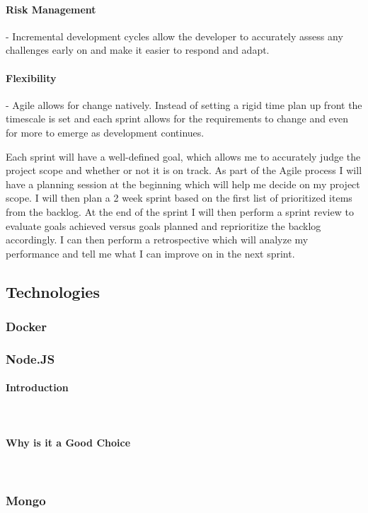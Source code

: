 \documentclass{article}
\begin{document}
\paragraph{Risk Management}- Incremental development cycles allow the developer to accurately assess any challenges early on and make it easier to respond and adapt.

\paragraph{Flexibility}- Agile allows for change natively. Instead of setting a rigid time plan up front the timescale is set and each sprint allows for the requirements to change and even for more to emerge as development continues.

Each sprint will have a well-defined goal, which allows me to accurately judge the project scope and whether or not it is on track. As part of the Agile process I will have a planning session at the beginning which will help me decide on my project scope. I will then plan a 2 week sprint based on the first list of prioritized items from the backlog.  At the end of the sprint I will then perform a sprint review to evaluate goals achieved versus goals planned and reprioritize the backlog accordingly. I can then perform a retrospective which will analyze my performance and tell me what I can improve on in the next sprint.


\subsection{Technologies}
\subsubsection{Docker}
\subsubsection{Node.JS}
\paragraph{Introduction}\mbox{}\\
\paragraph{Why is it a Good Choice}\mbox{}\\
\subsubsection{Mongo}
\end{document}
